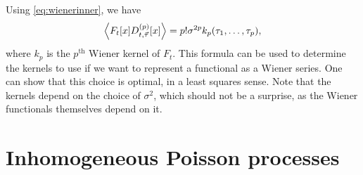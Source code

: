 \documentclass[12pt]{article}
\theoremstyle{slplain}
\theoremstyle{sldefinition}
\theoremstyle{remark}
\begin{document}
Using \eqref{eq:wienerinner}, we have
%
\begin{equation}\label{eq:wienerkern}
  \left\langle F_t[x] D^{(p)}_{t,\vec{\tau}}[x] \right\rangle = p!\sigma^{2p}k_p(\tau_1,\ldots,\tau_p),
\end{equation}
%
where $k_p$ is the $p^{\text{th}}$ Wiener kernel of $F_t$. This formula can be used to determine the kernels to use if we want to represent a functional as a Wiener series. One can show that this choice is optimal, in a least squares sense. Note that the kernels depend on the choice of $\sigma^2$, which should not be a surprise, as the Wiener functionals themselves depend on it.




\section{Inhomogeneous Poisson processes}\label{sec:poisson}
















\end{document}
